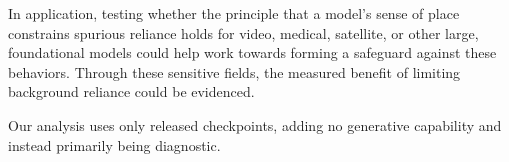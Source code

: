 \documentclass[10pt,twocolumn,letterpaper]{article}
\begin{document}
In application, testing whether the principle that a model's sense of place constrains spurious reliance holds for video, medical, satellite, or other large, foundational models could help work towards forming a safeguard against these behaviors. Through these sensitive fields, the measured benefit of limiting background reliance could be evidenced.

Our analysis uses only released checkpoints, adding no generative capability and instead primarily being diagnostic.


{\small


}
\end{document}
